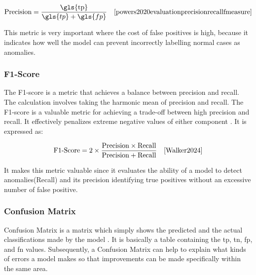 \begin{equation}
    \text{Precision} = \frac{\text{\gls{tp}}}{\gls{tp} + \gls{fp}} \quad \text{\cite{powers2020evaluationprecisionrecallfmeasure}}
    \label{eq:precision}
\end{equation}

This metric is very important where the cost of false positives is high, because it indicates how well the model can prevent incorrectly labelling normal cases as anomalies. 

\subsubsection*{F1-Score}
\label{subsec:F1-Score}

The F1-score is a metric that achieves a balance between precision and recall. The calculation involves taking the harmonic mean of precision and recall. The F1-score is a valuable metric for achieving a trade-off between high precision and recall. It effectively penalizes extreme negative values of either component \cite{Walker2024}. It is expressed as:

\begin{equation}
\text{F1-Score} = 2 \times \frac{\text{Precision} \times \text{Recall}}{\text{Precision} + \text{Recall}} \quad \text{\cite{Walker2024}}
\end{equation}

It makes this metric valuable since it evaluates the ability of a model to detect anomalies(Recall) and  its precision identifying true positives without an excessive number of false positive. 

\subsubsection*{Confusion Matrix}
\label{subsec:Confusion Matrix}

Confusion Matrix is a matrix which simply shows the predicted and the actual classifications made by the model \cite{Kohavi1998}. It is basically a table containing the \gls{tp}, \gls{tn}, \gls{fp}, and \gls{fn} values. Subsequently, a Confusion Matrix can help to explain what kinds of errors a model makes so that improvements can be made specifically within the same area.

